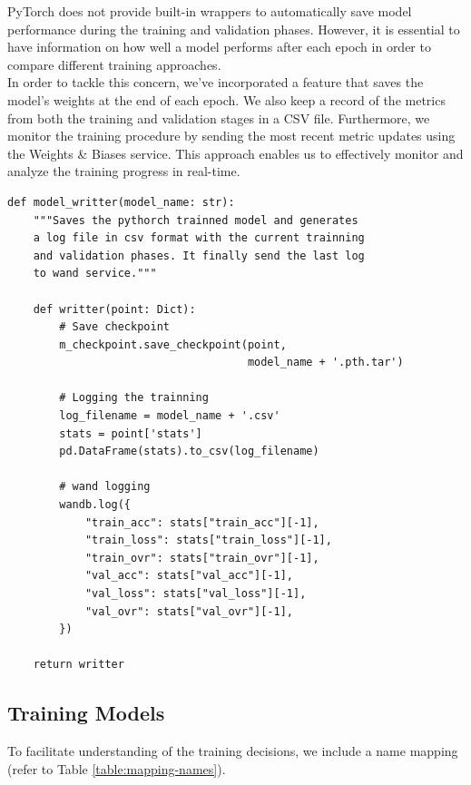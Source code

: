 PyTorch does not provide built-in wrappers to automatically save model
performance during the training and validation phases. However, it is essential
to have information on how well a model performs after each epoch in order to
compare different training approaches. \\

In order to tackle this concern, we've incorporated a feature that saves the
model's weights at the end of each epoch. We also keep a record of the metrics
from both the training and validation stages in a CSV file. Furthermore, we
monitor the training procedure by sending the most recent metric updates using
the Weights \& Biases service. This approach enables us to effectively monitor
and analyze the training progress in real-time.

\begin{Verbatim}[fontsize=\scriptsize]
def model_writter(model_name: str):
    """Saves the pythorch trainned model and generates
    a log file in csv format with the current trainning
    and validation phases. It finally send the last log
    to wand service."""

    def writter(point: Dict):
        # Save checkpoint
        m_checkpoint.save_checkpoint(point,
                                     model_name + '.pth.tar')

        # Logging the trainning
        log_filename = model_name + '.csv'
        stats = point['stats']
        pd.DataFrame(stats).to_csv(log_filename)

        # wand logging
        wandb.log({
            "train_acc": stats["train_acc"][-1],
            "train_loss": stats["train_loss"][-1],
            "train_ovr": stats["train_ovr"][-1],
            "val_acc": stats["val_acc"][-1],
            "val_loss": stats["val_loss"][-1],
            "val_ovr": stats["val_ovr"][-1],
        })

    return writter
\end{Verbatim}

\newpage


\subsection{Training Models}

To facilitate understanding of the training decisions, we include a name
mapping (refer to Table \ref{table:mapping-names}).

